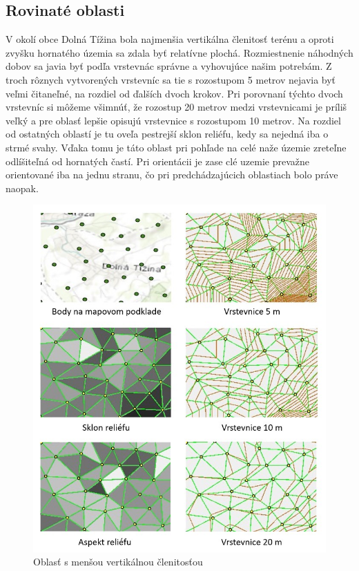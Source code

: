 \documentclass[12pt]{article}
\begin{document}
\subsection*{Rovinaté oblasti}
V okolí obce Dolná Tížina bola najmenšia vertikálna členitosť terénu a oproti zvyšku hornatého územia sa zdala byť relatívne plochá. Rozmiestnenie náhodných dobov sa javia byť podľa vrstevnác správne a vyhovujúce našim potrebám. Z troch rôznych vytvorených vrstevníc sa tie s rozostupom 5 metrov nejavia byť veľmi čitaneľné, na rozdiel od ďalších dvoch krokov. Pri porovnaní týchto dvoch vrstevníc si môžeme všimnúť, že rozostup 20 metrov medzi vrstevnicami je príliš veľký a pre oblasť lepšie opisujú vrstevnice s rozostupom 10 metrov. Na rozdiel od ostatných oblastí je tu oveľa pestrejší sklon reliéfu, kedy sa nejedná iba o strmé svahy. Vďaka tomu je táto oblast pri pohľade na celé naže územie zreteľne odlíšiteľná od hornatých častí. Pri orientácii je zase clé uzemie prevažne orientované iba na jednu stranu, čo pri predchádzajúcich oblastiach bolo práve naopak.  
\begin{figure}[h]
    \centering
    \includegraphics[width=0.6\linewidth]{latex/images/plocha.jpg}
    \caption{Oblasť s menšou vertikálnou členitosťou}
    \label{fig:enter-label}
\end{figure}
\end{document}
